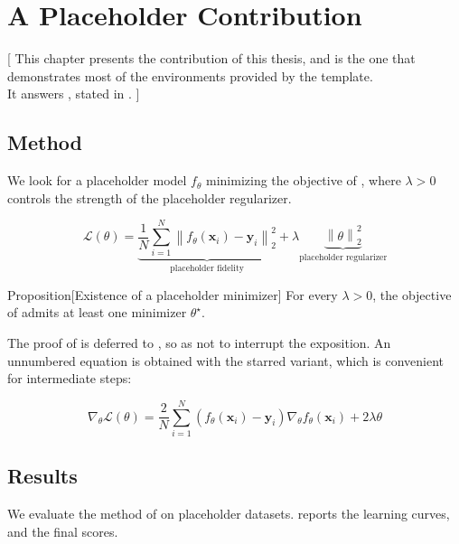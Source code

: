 \chapter[phd_contribution]{A Placeholder Contribution}
 [
  This chapter presents the contribution of this thesis, and is the one that demonstrates most of the environments provided by the template. \\
  It answers , stated in .
 ]

\section[phd_contribution_method]{Method}

We look for a placeholder model $f_\theta$ minimizing the objective of , where $\lambda > 0$ controls the strength of the placeholder regularizer.

\begin{equation}[phd_contribution_loss]
    \mathcal{L}(\theta) = \underbrace{\frac{1}{N} \sum_{i = 1}^{N} \left\| f_\theta(\bm{x}_i) - \bm{y}_i \right\|_2^2}_{\text{placeholder fidelity}} + \lambda \underbrace{\left\| \theta \right\|_2^2}_{\text{placeholder regularizer}}
\end{equation}

\begin{boxenv}{Proposition}[Existence of a placeholder minimizer]
    For every $\lambda > 0$, the objective of  admits at least one minimizer $\theta^\star$.
\end{boxenv}

The proof of  is deferred to , so as not to interrupt the exposition.
An unnumbered equation is obtained with the starred variant, which is convenient for intermediate steps:

\begin{equation*}
    \nabla_\theta \mathcal{L}(\theta) = \frac{2}{N} \sum_{i = 1}^{N} \left( f_\theta(\bm{x}_i) - \bm{y}_i \right) \nabla_\theta f_\theta(\bm{x}_i) + 2 \lambda \theta
\end{equation*}

\section[phd_contribution_results]{Results}

We evaluate the method of  on placeholder datasets.
 reports the learning curves, and  the final scores.


